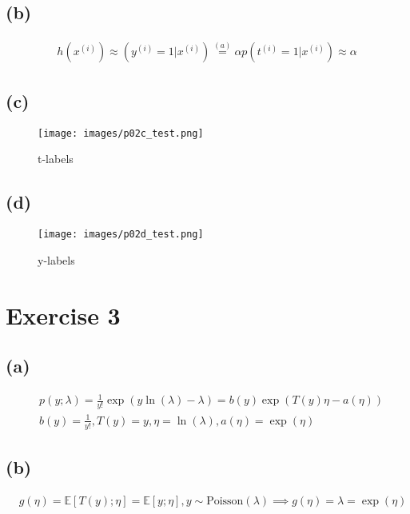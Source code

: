 \documentclass{article}
\begin{document}
\subsection*{(b)}

\begin{align*}
  h(x^{(i)})\approx(y^{(i)}=1|x^{(i)})\overset{(a)}{=}\alpha p(t^{(i)}=1|x^(i))\approx \alpha
\end{align*}

\newpage

\subsection*{(c)}

\begin{figure}[h]
  \centering
  \texttt{[image: images/p02c\_test.png]}
  \caption{t-labels}
  \label{fig:enter-label}
\end{figure}

\newpage

\subsection*{(d)}

\begin{figure}[h]
  \centering
  \texttt{[image: images/p02d\_test.png]}
  \caption{y-labels}
  \label{fig:enter-label}
\end{figure}

\newpage

\section*{Exercise 3}
\subsection*{(a)}

\begin{align*}
    & p(y;\lambda)=\frac{1}{y!}\exp(y\ln(\lambda)-\lambda)=b(y)\exp(T(y)\eta-a(\eta)) \\
    & b(y)=\frac{1}{y!},T(y)=y,\eta=\ln(\lambda),a(\eta)=\exp(\eta)
\end{align*}

\subsection*{(b)}

\begin{align*}
    & g(\eta)=\mathbb{E}[T(y);\eta]=\mathbb{E}[y;\eta],y\sim\text{Poisson}(\lambda)\implies g(\eta)=\lambda=\exp(\eta)
\end{align*}
\end{document}
